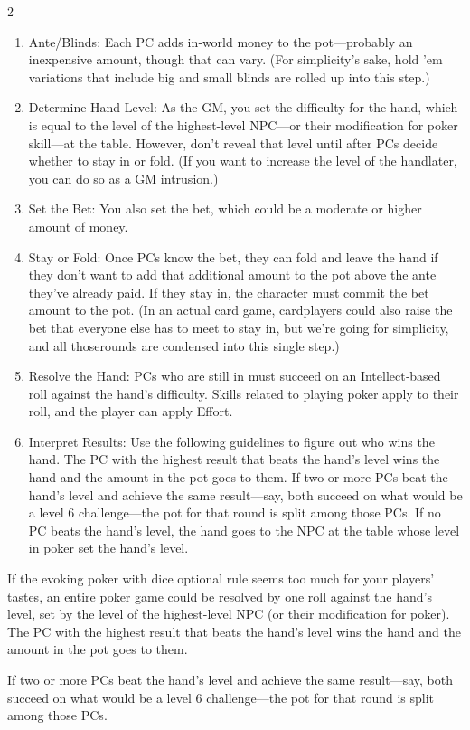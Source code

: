 \begin{multicols}{2}
\begin{enumerate}
\item Ante/Blinds: Each PC adds in‑world money to the pot—probably an inexpensive amount, though that can vary. (For simplicity’s sake, hold ’em variations that include big and small blinds are rolled up into this step.)
\item Determine Hand Level: As the GM, you set the difficulty for the hand, which is equal to the level of the highest-level NPC—or their modification for poker skill—at the table. However, don’t reveal that level until after PCs decide whether to stay in or fold. (If you want to increase the level of the handlater, you can do so as a GM intrusion.)
\item Set the Bet: You also set the bet, which could be a moderate or higher amount of money.
\item Stay or Fold: Once PCs know the bet, they can fold and leave the hand if they don’t want to add that additional amount to the pot above the ante they’ve already paid. If they stay in, the character must commit the bet amount to the pot. (In an actual card game, cardplayers could also raise the bet that everyone else has to meet to stay in, but we’re going for simplicity, and all thoserounds are condensed into this single step.)
\item Resolve the Hand: PCs who are still in must succeed on an Intellect‑based roll against the hand’s difficulty. Skills related to playing poker apply to their roll, and the player can apply Effort.
\item Interpret Results: Use the following guidelines to figure out who wins the hand. The PC with the highest result that beats the hand’s level wins the hand and the amount in the pot goes to them. If two or more PCs beat the hand’s level and achieve the same result—say, both succeed on what would be a level 6 challenge—the pot for that round is split among those PCs. If no PC beats the hand’s level, the hand goes to the NPC at the table whose level in poker set the hand’s level.
\end{enumerate}

If the evoking poker with dice optional rule seems too much for your players’ tastes, an entire poker game could be resolved by one roll against the hand’s level, set by the level of the highest-level NPC (or their modification for poker). The PC with the highest result that beats the hand’s level wins the hand and the amount in the pot goes to them. 

If two or more PCs beat the hand’s level and achieve the same result—say, both succeed on what would be a level 6 challenge—the pot for that round is split among those PCs. 


\end{multicols}
